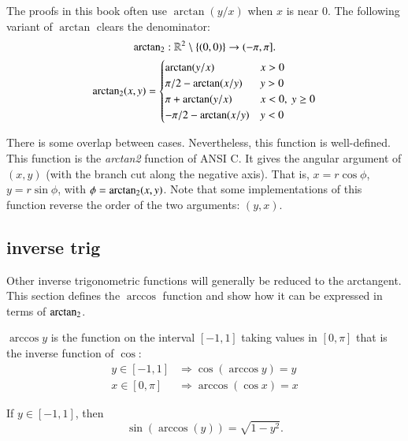 The proofs in this book often use $\arctan(y/x)$ when $x$ is near $0$.
The following variant of $\arctan$ clears the denominator:
$$
{\operatorname{arctan_2}}: \mathbb{R}^2\setminus\{(0,0)\} \to (-\pi,\pi].
$$
$$
{\operatorname{arctan_2}}(x,y) = \begin{cases}
   \arctan(y/x) & x > 0\\
   \pi/2- \arctan(x/y) & y > 0 \\
   \pi + \arctan(y/x) & x< 0,\  y\ge 0\\
   -\pi/2- \arctan(x/y) & y< 0 \\
\end{cases}
$$


There is some overlap between cases. Nevertheless, 
this function is well-defined.  
This function is the {\it arctan2} function of ANSI C.  It gives the
angular argument of $(x,y)$ (with the branch cut along the negative axis).
That is, $x = r\cos\phi$, $y=r\sin\phi$, with $\phi={\operatorname{arctan_2}}(x,y)$.
Note that some implementations of this function reverse the order of the two arguments: $(y,x)$.


\subsection{inverse trig}
Other inverse trigonometric functions will generally be reduced to
the arctangent.  This section defines the $\arccos$ function and show how it can be expressed in terms of ${\operatorname{arctan_2}}$.

\begin{definition}[arccos]\label{def:arccos}
$\arccos y$ is the function on the interval $[-1,1]$
taking values in $[0,\pi]$ that is the inverse function of $\cos$:
    $$\begin{array}{lll}
        y\in [-1,1] &\Rightarrow \cos(\arccos y) = y\\
        x\in[0,\pi] &\Rightarrow \arccos(\cos x) = x
    \end{array}$$
\end{definition}

\begin{lemma}\label{lemma:sin-arccos} 
If $y\in[-1,1]$, then
    $$\sin(\arccos(y)) = \sqrt{1-y^2}.$$
\end{lemma}

